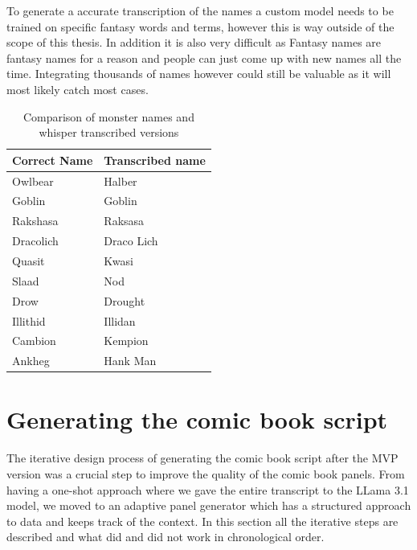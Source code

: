 To generate a accurate transcription of the names a custom model needs to be trained on specific fantasy words and terms, however this is way outside of the scope of this thesis. In addition it is also very difficult as Fantasy names are fantasy names for a reason and people can just come up with new names all the time. Integrating thousands of names however could still be valuable as it will most likely catch most cases.
\begin{table}[h!]
\centering
\begin{tabular}{|l|l|}
\hline
\textbf{Correct Name} & \textbf{Transcribed name} \\
\hline
Owlbear    & Halber     \\
Goblin     & Goblin     \\
Rakshasa   & Raksasa    \\
Dracolich  & Draco Lich \\
Quasit     & Kwasi      \\
Slaad      & Nod        \\
Drow       & Drought    \\
Illithid   & Illidan    \\
Cambion    & Kempion    \\
Ankheg     & Hank Man   \\
\hline
\end{tabular}
\caption{Comparison of monster names and whisper transcribed versions}
\label{tab:monster_names}
\end{table}


\section{Generating the comic book script}
The iterative design process of generating the comic book script after the MVP version was a crucial step to improve the quality of the comic book panels. From having a one-shot approach where we gave the entire transcript to the LLama 3.1 model, we moved to an adaptive panel generator which has a structured approach to data and keeps track of the context. In this section all the iterative steps are described and what did and did not work in chronological order.

